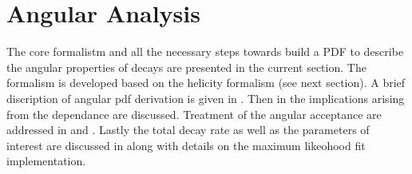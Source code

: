 

\section{Angular Analysis}
\label{Angular_Analysis}

The core formalistm and all the necessary steps towards build a PDF to describe the angular properties of \BJpsiKst decays are presented in
the current section. The formalism is developed based on the helicity formalism (see next section). A brief discription of 
angular pdf derivation is given in . Then in  the implications arising from the
\mkpi dependance are discussed. Treatment of the angular acceptance are addressed in  and .
Lastly the total decay rate as well as the \ACP parameters of interest are discussed in  along with details
on the maximum likeohood fit implementation.


